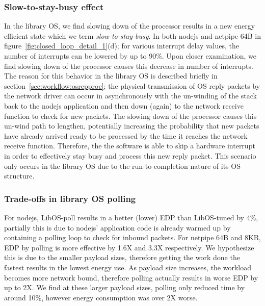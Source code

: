 \subsubsection{Slow-to-stay-busy effect}
In the library OS, we find slowing down of the processor results in a new energy efficient state which we term \textit{slow-to-stay-busy}. In both nodejs and netpipe 64B in figure~\ref{fig:closed_loop_detail_1}(d); for various interrupt delay values, the number of interrupts can be lowered by up to 90\%. Upon closer examination, we find slowing down of the processor causes this decrease in number of interrupts. The reason for this behavior in the library OS is described briefly in section~\ref{sec:workflow:osrepproc}; the physical transmission of OS reply packets by the network driver can occur in asynchronously with the un-winding of the stack back to the nodejs application and then down (again) to the network receive function to check for new packets. The slowing down of the processor causes this un-wind path to lengthen, potentially increasing the probability that new packets have already arrived ready to be processed by the time it reaches the network receive function. Therefore, the the software is able to skip a hardware interrupt in order to effectively stay busy and process this new reply packet. This scenario only occurs in the library OS due to the run-to-completion nature of its OS structure.



\subsubsection{Trade-offs in library OS polling}
 For nodejs, LibOS-poll results in a better (lower) EDP than LibOS-tuned by 4\%, partially this is due to nodejs' application code is already warmed up by containing a polling loop to check for inbound packets. For netpipe 64B and 8KB, EDP by polling is more effective by 1.6X and 3.3X respectively. We hypothesize this is due to the smaller payload sizes, therefore getting the work done the fastest results in the lowest energy use. As payload size increases, the workload becomes more network bound, therefore polling actually results in worse EDP by up to 2X. We find at these larger payload sizes, polling only reduced time by around 10\%, however energy consumption was over 2X worse.

